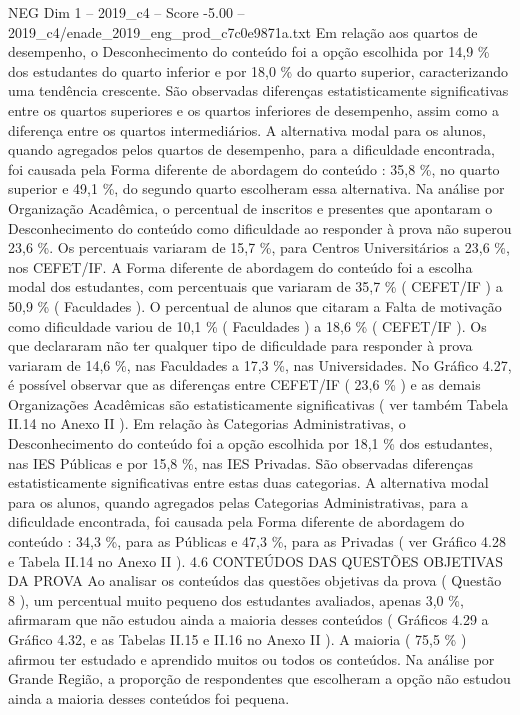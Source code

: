\begin{textsample}{NEG Dim 1 – 2019\_c4 – Score -5.00 – 2019\_c4/enade\_2019\_eng\_prod\_c7c0e9871a.txt}
Em relação aos quartos de desempenho, o Desconhecimento do conteúdo foi a opção escolhida por 14,9 \% dos estudantes do quarto inferior e por 18,0 \% do quarto superior, caracterizando uma tendência crescente.
São observadas diferenças estatisticamente significativas entre os quartos superiores e os quartos inferiores de desempenho, assim como a diferença entre os quartos intermediários.
A alternativa modal para os alunos, quando agregados pelos quartos de desempenho, para a dificuldade encontrada, foi causada pela Forma diferente de abordagem do conteúdo : 35,8 \%, no quarto superior e 49,1 \%, do segundo quarto escolheram essa alternativa.
Na análise por Organização Acadêmica, o percentual de inscritos e presentes que apontaram o Desconhecimento do conteúdo como dificuldade ao responder à prova não superou 23,6 \%.
Os percentuais variaram de 15,7 \%, para Centros Universitários a 23,6 \%, nos CEFET/IF.
A Forma diferente de abordagem do conteúdo foi a escolha modal dos estudantes, com percentuais que variaram de 35,7 \% ( CEFET/IF ) a 50,9 \% ( Faculdades ).
O percentual de alunos que citaram a Falta de motivação como dificuldade variou de 10,1 \% ( Faculdades ) a 18,6 \% ( CEFET/IF ).
Os que declararam não ter qualquer tipo de dificuldade para responder à prova variaram de 14,6 \%, nas Faculdades a 17,3 \%, nas Universidades.
No Gráfico 4.27, é possível observar que as diferenças entre CEFET/IF ( 23,6 \% ) e as demais Organizações Acadêmicas são estatisticamente significativas ( ver também Tabela II.14 no Anexo II ).
Em relação às Categorias Administrativas, o Desconhecimento do conteúdo foi a opção escolhida por 18,1 \% dos estudantes, nas IES Públicas e por 15,8 \%, nas IES Privadas.
São observadas diferenças estatisticamente significativas entre estas duas categorias.
A alternativa modal para os alunos, quando agregados pelas Categorias Administrativas, para a dificuldade encontrada, foi causada pela Forma diferente de abordagem do conteúdo : 34,3 \%, para as Públicas e 47,3 \%, para as Privadas ( ver Gráfico 4.28 e Tabela II.14 no Anexo II ). 4.6 CONTEÚDOS DAS QUESTÕES OBJETIVAS DA PROVA Ao analisar os conteúdos das questões objetivas da prova ( Questão 8 ), um percentual muito pequeno dos estudantes avaliados, apenas 3,0 \%, afirmaram que não estudou ainda a maioria desses conteúdos ( Gráficos 4.29 a Gráfico 4.32, e as Tabelas II.15 e II.16 no Anexo II ).
A maioria ( 75,5 \% ) afirmou ter estudado e aprendido muitos ou todos os conteúdos.
Na análise por Grande Região, a proporção de respondentes que escolheram a opção não estudou ainda a maioria desses conteúdos foi pequena.

\end{textsample}
